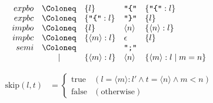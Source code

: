 \begin{align*}
  \begin{array}{rclll}
    {expbo}
    & \Coloneq & \{l\} &\text{\texttt{\textquotedbl\{\textquotedbl}} &\{\text{\texttt{\textquotedbl\{\textquotedbl}}:l\} \\
    {expbc}
    & \Coloneq & \{\text{\texttt{\textquotedbl\{\textquotedbl}}:l\} &\text{\texttt{\textquotedbl\}\textquotedbl}} &\{l\} \\
    {impbo}
    & \Coloneq & \{l\} & \langle n\rangle &\{\langle n\rangle:l\} \\
    {impbc}
    & \Coloneq & \{\langle m\rangle:l\} &\epsilon &\{l\} \\
    {semi}
    & \Coloneq & &\text{\texttt{\textquotedbl ;\textquotedbl}} \\
    & \mid & \{\langle m\rangle:l\} & \langle n\rangle &\{\langle m\rangle:l \mid m = n\}
  \end{array}
\end{align*}

\begin{align*}
  \mathrm{skip}(l, t) &= \left\{\begin{array}{ll}
    \mathrm{true} &(l = \langle m\rangle:l' \land t = \langle n\rangle \land m < n) \\
    \mathrm{false} &(\text{otherwise})
  \end{array}\right.
\end{align*}
